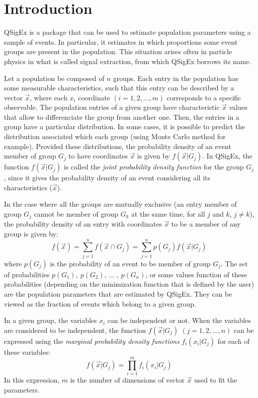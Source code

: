 \chapter{Introduction} \label{intro}
QSigEx is a package that can be used to estimate population parameters using a
sample of events. In particular, it estimates in which proportions some event
groups are present in the population. This situation arises often in particle
physics in what is called signal extraction, from which QSigEx borrows its name. 

Let a population be composed of $n$ groups. Each entry in the population has
some measurable characteristics, such that this entry can be described by a
vector $\vec{x}$, where each $x_i$ coordinate $(i=1,2,\ldots,m)$ corresponds to
a specific observable. The population entries of a given group have
characteristic $\vec{x}$ values that allow to differenciate the group from
another one. Then, the entries in a group have a particular distribution. In
some cases, it is possible to predict the distribution associated which each
group (using Monte Carlo method for example). Provided these distributions, the
probability density of an event member of group $G_j$ to have coordinates
$\vec{x}$ is given by $f(\vec{x}|G_j)$. In QSigEx, the function $f(\vec{x}|G_j)$
is called the {\em joint probability density function} for the group $G_j$,
since it gives the probability density of an event considering all its
characteristics ($\vec{x}$).

In the case where all the groups are mutually exclusive (an entry member of
group $G_j$ cannot be member of group $G_k$ at the same time, for all $j$ and
$k$, $j\ne k$), the probability density of an entry with coordinates $\vec{x}$
to be a member of any group is given by:
\begin{equation}
f(\vec{x})=\sum_{j=1}^n f(\vec{x}\cap G_j)=\sum_{j=1}^n p(G_j)f(\vec{x}|G_j)
\end{equation}
where $p(G_j)$ is the probability of an event to be member of group $G_j$. The
set of probabilities $p(G_1),\ p(G_2),\ \ldots\ ,\ p(G_n)$, or some values
function of these probabilities (depending on the minimization function that is
defined by the user) are the population parameters that are estimated by QSigEx.
They can be viewed as the fraction of events which belong to a given group. 

In a given group, the variables $x_i$ can be independent or not. When the
variables are considered to be independent, the function $f(\vec{x}|G_j)$
$(j=1,2,\ldots,n)$ can be expressed using the {\em marginal probability density
functions} $f_i(x_i|G_j)$ for each of these variables:
\begin{equation} \label{i:jpdfvsmpdf}
f(\vec{x}|G_j)=\prod_{i=1}^{m} f_i(x_i|G_j)
\end{equation}
In this expression, $m$ is the number of dimensions of vector $\vec{x}$ used to
fit the parameters. 

